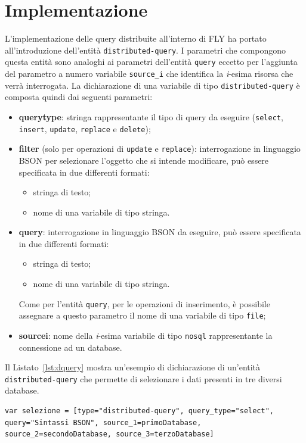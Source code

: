 \section{Implementazione}
L'implementazione delle query distribuite all'interno di FLY ha portato all'introduzione dell'entità \verb|distributed-query|. I parametri che compongono questa entità sono analoghi ai parametri dell'entità \verb|query| eccetto per l'aggiunta del parametro a numero variabile \verb|source_i| che identifica la \textit{i}-esima risorsa che verrà interrogata. La dichiarazione di una variabile di tipo \verb|distributed-query| è composta quindi dai seguenti parametri:
\begin{itemize}
    \item \textbf{query\textunderscore type}: stringa rappresentante il tipo di query da eseguire (\verb|select|, \verb|insert|, \verb|update|, \verb|replace| e \verb|delete|);
    \item \textbf{filter} (solo per operazioni di \verb|update| e \verb|replace|): interrogazione in linguaggio BSON per selezionare l'oggetto che si intende modificare, può essere specificata in due differenti formati:
    \begin{itemize}
        \item stringa di testo;
        \item nome di una variabile di tipo stringa.
    \end{itemize}
    \item \textbf{query}: interrogazione in linguaggio BSON da eseguire, può essere specificata in due differenti formati:
    \begin{itemize}
         \item stringa di testo;
         \item nome di una variabile di tipo stringa.
    \end{itemize}
    Come per l'entità \verb|query|, per le operazioni di inserimento, è possibile assegnare a questo parametro il nome di una variabile di tipo \verb|file|;
    \item \textbf{source\textunderscore i}: nome della \textit{i}-esima variabile di tipo \verb|nosql| rappresentante la connessione ad un database.
\end{itemize}
Il Listato~\ref{lst:dquery} mostra un'esempio di dichiarazione di un'entità \verb|distributed-query| che permette di selezionare i dati presenti in tre diversi database.
\begin{lstlisting}[language=FLY,caption={Dichiarazione di query distribuita di tipo selezione su tre database diversi.}, label={lst:dquery}]
var selezione = [type="distributed-query", query_type="select", query="Sintassi BSON", source_1=primoDatabase, source_2=secondoDatabase, source_3=terzoDatabase]
\end{lstlisting}

